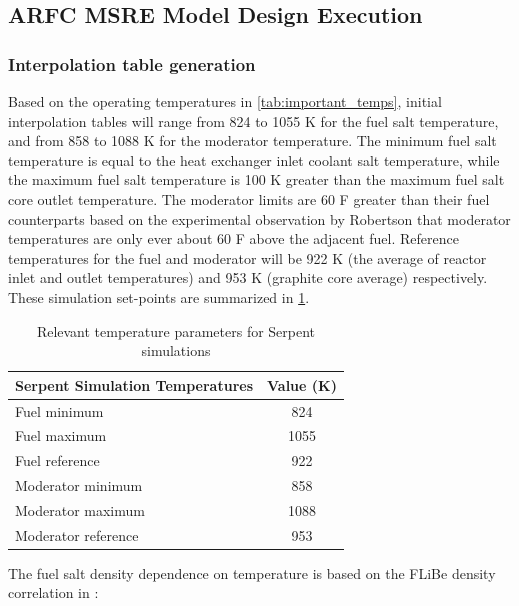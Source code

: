 \documentclass{article}
\let\Oldsubsection\subsection
\renewcommand{\subsection}{\FloatBarrier\Oldsubsection}
\let\Oldsubsubsection\subsubsection
\renewcommand{\subsubsection}{\FloatBarrier\Oldsubsubsection}
\begin{document}
\subsection{\gls{ARFC} \gls{MSRE} Model Design Execution}

\subsubsection{Interpolation table generation}

Based on the operating temperatures in \cref{tab:important_temps}, initial
interpolation tables will range from 824 to 1055 K for the fuel salt
temperature, and from 858 to 1088 K for the moderator temperature. The minimum
fuel salt temperature is equal to the heat exchanger inlet coolant salt
temperature, while the maximum fuel salt temperature is 100 K greater than the
maximum fuel salt core outlet temperature. The moderator limits are 60
\textdegree F greater than their fuel counterparts based on the experimental
observation by Robertson that moderator temperatures are only ever about 60
\textdegree F above the adjacent fuel. Reference temperatures for the fuel and
moderator will be 922 K (the average of reactor inlet and outlet temperatures)
and 953 K (graphite core average) respectively. These simulation set-points are
summarized in \cref{tab:sim_temps}.

\begin{table}[htpb]
    \begin{center}
      \begin{tabular}{l|c}
        Serpent Simulation Temperatures & Value (K)\\
        \hline \hline
        Fuel minimum        & 824 \\
        Fuel maximum        & 1055 \\
        Fuel reference      & 922 \\
        Moderator minimum   & 858 \\
        Moderator maximum   & 1088 \\
        Moderator reference & 953 \\
      \end{tabular}
    \end{center}
    \caption{Relevant temperature parameters for Serpent simulations}
    \label{tab:sim_temps}
\end{table}

The fuel salt density dependence on temperature is based on the \gls{FLiBe}
density correlation in \cite{serrano-lopez_molten_2013}:
\end{document}
